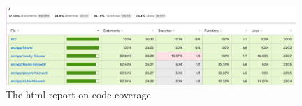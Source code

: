 \begin{figure}
\begin{center}
\includegraphics[width=11cm]{figures/testing_coverage_metrics}
\end{center}
\caption{The html report on code coverage}
\label{fig:testing_coverage_metrics}
\end{figure}